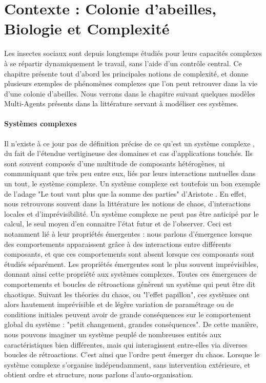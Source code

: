 \chapter*{Contexte : Colonie d'abeilles, Biologie et Complexité}
	\label{sectionBio}
	
	Les insectes sociaux sont depuis longtemps étudiés pour leurs capacités complexes à se répartir dynamiquement le travail, sans l'aide d'un contrôle central. Ce chapitre présente tout d'abord les principales notions de complexité, et donne plusieurs exemples de phénomènes complexes que l'on peut retrouver dans la vie d'une colonie d'abeilles. Nous verrons dans le chapitre suivant quelques modèles Multi-Agents présents dans la littérature servant à modéliser ces systèmes.

	
		\subsubsection{Systèmes complexes}
		
			Il n'existe à ce jour pas de définition précise de ce qu'est un système complexe \cite{heylighen_complexity_2008}, du fait de l'étendue vertigineuse des domaines et cas d'applications touchés. Ils sont souvent composés d'une multitude de composants hétérogènes, ni communiquant que très peu entre eux, liés par leurs interactions mutuelles dans un tout, le système complexe. Un système complexe est toutefois un bon exemple de l'adage "Le tout vaut plus que la somme des parties" d'Aristote \cite{edmonds_what_1999}. En effet, nous retrouvons souvent dans la littérature les notions de chaos, d'interactions locales et d'imprévisibilité. Un système complexe ne peut pas être anticipé par le calcul, le seul moyen d'en connaitre l'état futur et de l'observer. Ceci est notamment lié à leur propriétés émergentes : nous parlons d'émergence lorsque des comportements apparaissent grâce à des interactions entre différents composants, et que ces comportements sont absent lorsque ces composants sont étudiés séparément. Les propriétés émergentes sont le plus souvent imprévisibles, donnant ainsi cette propriété aux systèmes complexes. Toutes ces émergences de comportements et boucles de rétroactions génèrent un système qui peut être dit chaotique. Suivant les théories du chaos, ou "l'effet papillon", ces systèmes ont alors hautement imprévisible et de légère variation de paramétrage ou de conditions initiales peuvent avoir de grande conséquences sur le comportement global du système : "petit changement, grandes conséquences". De cette manière, nous pouvons imaginer un système peuplé de nombreuses entités aux caractéristiques bien différentes, mais qui interagissent entre-elles via diverses boucles de rétroactions. C'est ainsi que l'ordre peut émerger du chaos. Lorsque le système complexe s'organise indépendamment, sans intervention extérieure, et obtient ordre et structure, nous parlons d'auto-organisation.
			
